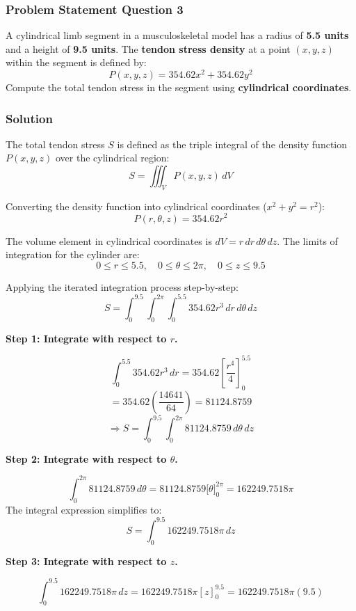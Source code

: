 \subsubsection*{Problem Statement Question 3}
A cylindrical limb segment in a musculoskeletal model has a radius of \textbf{5.5 units} and a height of \textbf{9.5 units}. The \textbf{tendon stress density} at a point $(x,y,z)$ within the segment is defined by:
\[ P(x, y, z) = 354.62x^2 + 354.62y^2 \]
Compute the total tendon stress in the segment using \textbf{cylindrical coordinates}.

\subsubsection*{Solution}
The total tendon stress $S$ is defined as the triple integral of the density function $P(x, y, z)$ over the cylindrical region:
\[ S = \iiint_V P(x, y, z) \, dV \]

Converting the density function into cylindrical coordinates ($x^2 + y^2 = r^2$):
\[ P(r, \theta, z) = 354.62r^2 \]

The volume element in cylindrical coordinates is $dV = r \, dr \, d\theta \, dz$. The limits of integration for the cylinder are:
\[ 0 \le r \le 5.5, \quad 0 \le \theta \le 2\pi, \quad 0 \le z \le 9.5 \]

Applying the iterated integration process step-by-step:
\[ S = \int_{0}^{9.5} \int_{0}^{2\pi} \int_{0}^{5.5} 354.62r^3 \, dr \, d\theta \, dz \]

\vspace{1cm}
\noindent\textbf{Step 1: Integrate with respect to $r$.}

\[ \int_{0}^{5.5} 354.62r^3 \, dr = 354.62 \left[ \frac{r^4}{4} \right]_{0}^{5.5} \]
\[ = 354.62 \left( \frac{14641}{64} \right) = 81124.8759 \]
\[ \Rightarrow S = \int_{0}^{9.5} \int_{0}^{2\pi} 81124.8759 \, d\theta \, dz \]

\vspace{1cm}
\noindent\textbf{Step 2: Integrate with respect to $\theta$.}

\[ \int_{0}^{2\pi} 81124.8759 \, d\theta = 81124.8759 \Big[\theta\Big]_{0}^{2\pi} = 162249.7518\pi \]
The integral expression simplifies to:
\[ S = \int_{0}^{9.5} 162249.7518\pi \, dz \]

\vspace{1cm}
\noindent\textbf{Step 3: Integrate with respect to $z$.}

\[ \int_{0}^{9.5} 162249.7518\pi \, dz = 162249.7518\pi [z]_{0}^{9.5} = 162249.7518\pi (9.5) \]

